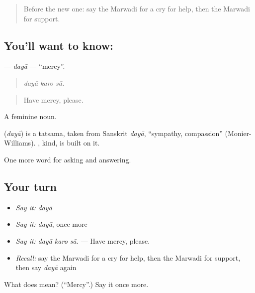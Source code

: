 \begin{quote}
Before the new one: say the Marwadi for a cry for help, then the Marwadi for support.
\end{quote}

\subsection*{You'll want to know: }
\textbf{} — \emph{dayā} — \textquotedblleft{}mercy\textquotedblright{}.

\begin{quote}
  
\end{quote}

\begin{quote}
\emph{dayā karo sā.}
\end{quote}

\begin{quote}
Have mercy, please.
\end{quote}

A feminine noun.

\begin{cousinweb}
\textbf{} (\emph{dayā}) is a tatsama, taken from Sanskrit \emph{dayā}, \textquotedblleft{}sympathy, compassion\textquotedblright{} (Monier-Williams). \textbf{}, kind, is built on it.
\end{cousinweb}

\begin{grammarlens}[title={What you've built}]
One more word for asking and answering.
\end{grammarlens}

\subsection*{Your turn}
\begin{itemize}
\raggedright
  \item \emph{Say it:} \emph{dayā}
  \item \emph{Say it:} \emph{dayā}, once more
  \item \emph{Say it:} \emph{dayā karo sā.} — Have mercy, please.
  \item \emph{Recall:} say the Marwadi for a cry for help, then the Marwadi for support, then say \emph{dayā} again
\end{itemize}

\begin{tcolorbox}[breakable,colback=teal!4,colframe=teal!35!black,title={Before you move on}]
What does  mean? (\textquotedblleft{}Mercy\textquotedblright{}.) Say it once more.
\end{tcolorbox}
